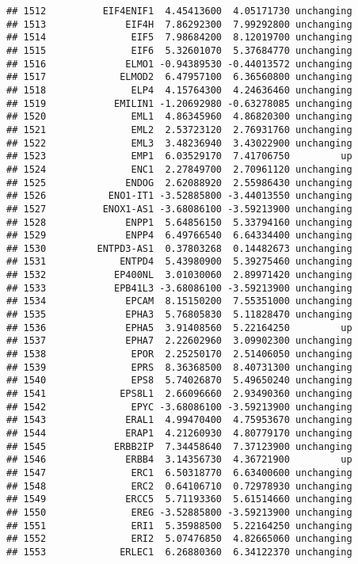 \documentclass[]{article}
\begin{document}
\begin{verbatim}
## 1512          EIF4ENIF1  4.45413600  4.05171730 unchanging
## 1513              EIF4H  7.86292300  7.99292800 unchanging
## 1514               EIF5  7.98684200  8.12019700 unchanging
## 1515               EIF6  5.32601070  5.37684770 unchanging
## 1516              ELMO1 -0.94389530 -0.44013572 unchanging
## 1517             ELMOD2  6.47957100  6.36560800 unchanging
## 1518               ELP4  4.15764300  4.24636460 unchanging
## 1519            EMILIN1 -1.20692980 -0.63278085 unchanging
## 1520               EML1  4.86345960  4.86820300 unchanging
## 1521               EML2  2.53723120  2.76931760 unchanging
## 1522               EML3  3.48236940  3.43022900 unchanging
## 1523               EMP1  6.03529170  7.41706750         up
## 1524               ENC1  2.27849700  2.70961120 unchanging
## 1525              ENDOG  2.62088920  2.55986430 unchanging
## 1526           ENO1-IT1 -3.52885800 -3.44013550 unchanging
## 1527          ENOX1-AS1 -3.68086100 -3.59213900 unchanging
## 1528              ENPP1  5.64856150  5.33794160 unchanging
## 1529              ENPP4  6.49766540  6.64334400 unchanging
## 1530         ENTPD3-AS1  0.37803268  0.14482673 unchanging
## 1531             ENTPD4  5.43980900  5.39275460 unchanging
## 1532            EP400NL  3.01030060  2.89971420 unchanging
## 1533            EPB41L3 -3.68086100 -3.59213900 unchanging
## 1534              EPCAM  8.15150200  7.55351000 unchanging
## 1535              EPHA3  5.76805830  5.11828470 unchanging
## 1536              EPHA5  3.91408560  5.22164250         up
## 1537              EPHA7  2.22602960  3.09902300 unchanging
## 1538               EPOR  2.25250170  2.51406050 unchanging
## 1539               EPRS  8.36368500  8.40731300 unchanging
## 1540               EPS8  5.74026870  5.49650240 unchanging
## 1541             EPS8L1  2.66096660  2.93490360 unchanging
## 1542               EPYC -3.68086100 -3.59213900 unchanging
## 1543              ERAL1  4.99470400  4.75953670 unchanging
## 1544              ERAP1  4.21260930  4.80779170 unchanging
## 1545            ERBB2IP  7.34458640  7.37123900 unchanging
## 1546              ERBB4  3.14356730  4.36721900         up
## 1547               ERC1  6.50318770  6.63400600 unchanging
## 1548               ERC2  0.64106710  0.72978930 unchanging
## 1549              ERCC5  5.71193360  5.61514660 unchanging
## 1550               EREG -3.52885800 -3.59213900 unchanging
## 1551               ERI1  5.35988500  5.22164250 unchanging
## 1552               ERI2  5.07476850  4.82665060 unchanging
## 1553             ERLEC1  6.26880360  6.34122370 unchanging

\end{verbatim}
\end{document}
